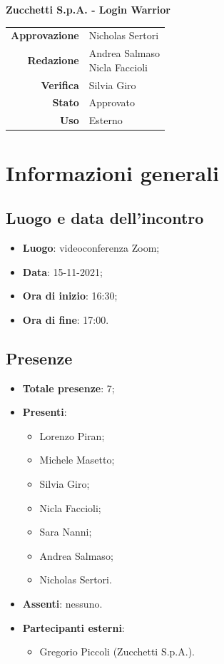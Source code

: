 \documentclass[11pt]{article}
\begin{document}
\begin{titlepage}
\begin{center}
			\large
			\textbf{Zucchetti S.p.A. - Login Warrior}\\
			
			\vfill
			
			\begin{tabular}{r|l}
				\textbf{Approvazione} &  Nicholas Sertori\\
				\textbf{Redazione} &  \parbox[t]{3.5cm}{Andrea Salmaso \\Nicla Faccioli}\\
				\textbf{Verifica} &  Silvia Giro\\
				\textbf{Stato} & Approvato \\
				\textbf{Uso} & Esterno
			\end{tabular}
			\vfill
			
		\end{center}
	\end{titlepage}

	\newpage

	\section{Informazioni generali}
	\subsection{Luogo e data dell'incontro}
	\begin{itemize}
		\item \textbf{Luogo}: videoconferenza Zoom;
		\item \textbf{Data}: 15-11-2021;
		\item \textbf{Ora di inizio}: 16:30;
		\item \textbf{Ora di fine}: 17:00.
	\end{itemize}
	
	\subsection{Presenze}
	\begin{itemize}
		\item \textbf{Totale presenze}: 7;
		\item \textbf{Presenti}:
		\begin{itemize}
			\item Lorenzo Piran; 
			\item Michele Masetto;
			\item Silvia Giro;
			\item Nicla Faccioli;
			\item Sara Nanni;
			\item Andrea Salmaso;
			\item Nicholas Sertori.
		\end{itemize}
		\item \textbf{Assenti}: nessuno.
		\item \textbf{Partecipanti esterni}: 
			\begin{itemize}
				\item Gregorio Piccoli (Zucchetti S.p.A.).
			\end{itemize}
	\end{itemize}
\end{document}
